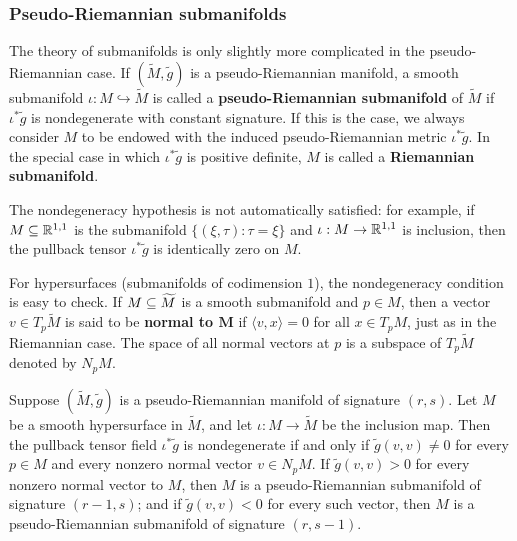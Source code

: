 \subsubsection{Pseudo-Riemannian submanifolds}
The theory of submanifolds is only slightly more complicated in the 
pseudo-Riemannian case. If $(\widetilde{M},\widetilde{g})$ is a 
pseudo-Riemannian manifold, a smooth submanifold $\iota:M\hookrightarrow\widetilde{M}$ 
is called a \textbf{pseudo-Riemannian submanifold} of $\widetilde{M}$ if $\iota^*\widetilde{g}$ 
is nondegenerate with constant signature. If this is the case, we always 
consider $M$ to be endowed with the induced pseudo-Riemannian metric $\iota^*\widetilde{g}$. 
In the special case in which $\iota^*\widetilde{g}$ is positive definite, 
$M$ is called a \textbf{Riemannian submanifold}.\par
The nondegeneracy hypothesis is not automatically satisfied: for example, 
if $M\subseteq\mathbb{R}^{1,1}$ is the submanifold $\{(\xi,\tau):\tau=\xi\}$ and $\iota:M\to\mathbb{R}^{1,1}$ 
is inclusion, then the pullback tensor $\iota^*\widetilde{g}$ is identically 
zero on $M$.\par
For hypersurfaces (submanifolds of codimension $1$), the nondegeneracy 
condition is easy to check. If $M\subseteq\widetilde{M}$ is a smooth 
submanifold and $p\in M$, then a vector $v\in T_p\widetilde{M}$ is said to 
be \textbf{normal to $\bm{M}$} if $\langle v,x\rangle=0$ for all $x\in T_pM$, 
just as in the Riemannian case. The space of all normal vectors at $p$ is 
a subspace of $T_p\widetilde{M}$ denoted by $N_pM$.
\begin{proposition}\label{pseudo Riemann submani}
Suppose $(\widetilde{M},\widetilde{g})$ is a pseudo-Riemannian manifold of 
signature $(r,s)$. Let $M$ be a smooth hypersurface in $\widetilde{M}$, and 
let $\iota:M\to\widetilde{M}$ be the inclusion map. Then the pullback 
tensor field $\iota^*\widetilde{g}$ is nondegenerate if and only if $\widetilde{g}(v,v)\neq 0$ 
for every $p\in M$ and every nonzero normal vector $v\in N_pM$. If $\widetilde{g}(v,v)>0$ 
for every nonzero normal vector to $M$, then $M$ is a pseudo-Riemannian 
submanifold of signature $(r-1,s)$; and if $\widetilde{g}(v,v)<0$ for every 
such vector, then $M$ is a pseudo-Riemannian submanifold of signature $(r,s-1)$.
\end{proposition}

